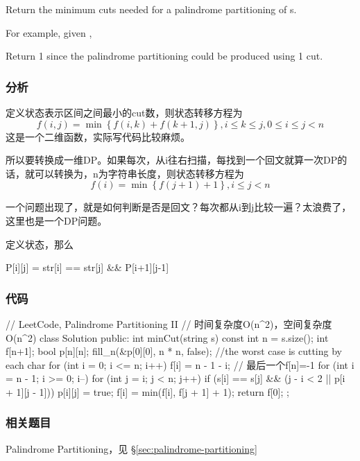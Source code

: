 Return the minimum cuts needed for a palindrome partitioning of s.

For example, given ,

Return 1 since the palindrome partitioning \code{["aa","b"]} could be produced using 1 cut.


\subsubsection{分析}
定义状态表示区间\fn{[i,j]}之间最小的cut数，则状态转移方程为 
$$
f(i,j)=\min\left\{f(i,k)+f(k+1,j)\right\}, i \leq k \leq j, 0 \leq i \leq j<n
$$
这是一个二维函数，实际写代码比较麻烦。
 
所以要转换成一维DP。如果每次，从i往右扫描，每找到一个回文就算一次DP的话，就可以转换为，n为字符串长度，则状态转移方程为
$$
f(i)=\min\left\{f(j+1)+1\right\}, i \leq j<n
$$

一个问题出现了，就是如何判断\fn{[i,j]}是否是回文？每次都从i到j比较一遍？太浪费了，这里也是一个DP问题。

定义状态，那么
\begin{Code}
P[i][j] = str[i] == str[j] && P[i+1][j-1]
\end{Code}


\subsubsection{代码}
\begin{Code}
// LeetCode, Palindrome Partitioning II
// 时间复杂度O(n^2)，空间复杂度O(n^2)
class Solution {
public:
    int minCut(string s) {
        const int n = s.size();
        int f[n+1];
        bool p[n][n];
        fill_n(&p[0][0], n * n, false);
        //the worst case is cutting by each char
        for (int i = 0; i <= n; i++)
            f[i] = n - 1 - i; // 最后一个f[n]=-1
        for (int i = n - 1; i >= 0; i--) {
            for (int j = i; j < n; j++) {
                if (s[i] == s[j] && (j - i < 2 || p[i + 1][j - 1])) {
                    p[i][j] = true;
                    f[i] = min(f[i], f[j + 1] + 1);
                }
            }
        }
        return f[0];
    }
};
\end{Code}


\subsubsection{相关题目}
\begindot
\item Palindrome Partitioning，见 \S \ref{sec:palindrome-partitioning}
\myenddot


